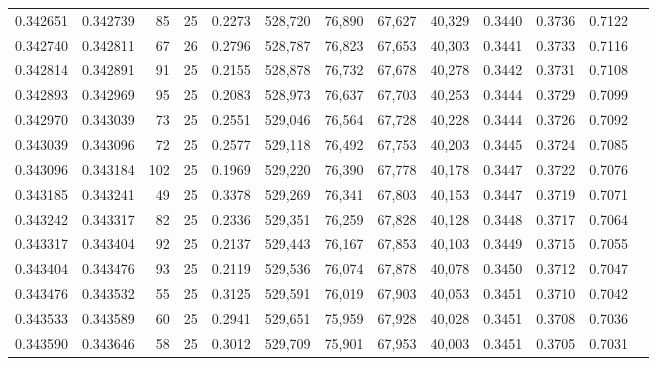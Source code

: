 \begin{tabular}{rrrrrrrrrrrrr}
0.342651 & 0.342739 &    85 &  25 &                                     0.2273 & 528,720 &  76,890 &  67,627 &  40,329 & 0.3440 & 0.3736 & 0.7122 \\
0.342740 & 0.342811 &    67 &  26 &                                     0.2796 & 528,787 &  76,823 &  67,653 &  40,303 & 0.3441 & 0.3733 & 0.7116 \\
0.342814 & 0.342891 &    91 &  25 &                                     0.2155 & 528,878 &  76,732 &  67,678 &  40,278 & 0.3442 & 0.3731 & 0.7108 \\
0.342893 & 0.342969 &    95 &  25 &                                     0.2083 & 528,973 &  76,637 &  67,703 &  40,253 & 0.3444 & 0.3729 & 0.7099 \\
0.342970 & 0.343039 &    73 &  25 &                                     0.2551 & 529,046 &  76,564 &  67,728 &  40,228 & 0.3444 & 0.3726 & 0.7092 \\
0.343039 & 0.343096 &    72 &  25 &                                     0.2577 & 529,118 &  76,492 &  67,753 &  40,203 & 0.3445 & 0.3724 & 0.7085 \\
0.343096 & 0.343184 &   102 &  25 &                                     0.1969 & 529,220 &  76,390 &  67,778 &  40,178 & 0.3447 & 0.3722 & 0.7076 \\
0.343185 & 0.343241 &    49 &  25 &                                     0.3378 & 529,269 &  76,341 &  67,803 &  40,153 & 0.3447 & 0.3719 & 0.7071 \\
0.343242 & 0.343317 &    82 &  25 &                                     0.2336 & 529,351 &  76,259 &  67,828 &  40,128 & 0.3448 & 0.3717 & 0.7064 \\
0.343317 & 0.343404 &    92 &  25 &                                     0.2137 & 529,443 &  76,167 &  67,853 &  40,103 & 0.3449 & 0.3715 & 0.7055 \\
0.343404 & 0.343476 &    93 &  25 &                                     0.2119 & 529,536 &  76,074 &  67,878 &  40,078 & 0.3450 & 0.3712 & 0.7047 \\
0.343476 & 0.343532 &    55 &  25 &                                     0.3125 & 529,591 &  76,019 &  67,903 &  40,053 & 0.3451 & 0.3710 & 0.7042 \\
0.343533 & 0.343589 &    60 &  25 &                                     0.2941 & 529,651 &  75,959 &  67,928 &  40,028 & 0.3451 & 0.3708 & 0.7036 \\
0.343590 & 0.343646 &    58 &  25 &                                     0.3012 & 529,709 &  75,901 &  67,953 &  40,003 & 0.3451 & 0.3705 & 0.7031 \\

\end{tabular}
